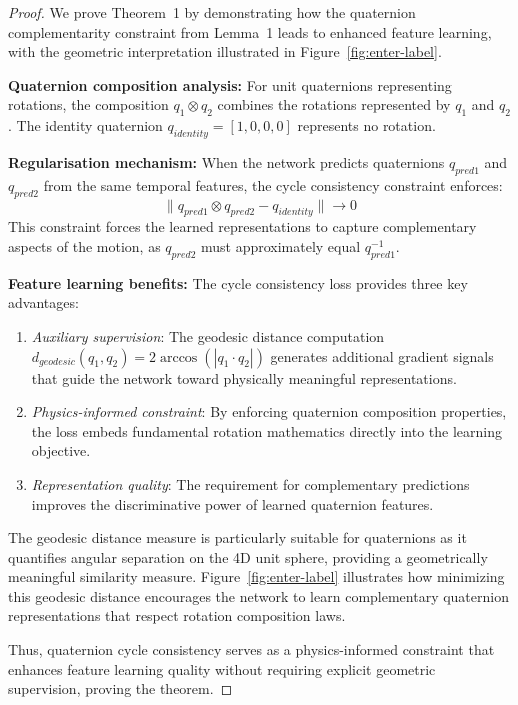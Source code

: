 \documentclass[journal]{IEEEtran}
\theoremstyle{plain}
\begin{document}
\begin{proof}
We prove Theorem~1 by demonstrating how the quaternion complementarity constraint from Lemma~1 leads to enhanced feature learning, with the geometric interpretation illustrated in Figure~\ref{fig:enter-label}.

\textbf{Quaternion composition analysis:}
For unit quaternions representing rotations, the composition $q_1 \otimes q_2$ combines the rotations represented by $q_1$ and $q_2$. The identity quaternion $q_{identity} = [1, 0, 0, 0]$ represents no rotation.

\textbf{Regularisation mechanism:}
When the network predicts quaternions $q_{pred1}$ and $q_{pred2}$ from the same temporal features, the cycle consistency constraint enforces:
\begin{equation}
\|q_{pred1} \otimes q_{pred2} - q_{identity}\| \to 0
\end{equation}
This constraint forces the learned representations to capture complementary aspects of the motion, as $q_{pred2}$ must approximately equal $q_{pred1}^{-1}$.

\textbf{Feature learning benefits:}
The cycle consistency loss provides three key advantages:
\begin{enumerate}
    \item \textit{Auxiliary supervision}: The geodesic distance computation $d_{geodesic}(q_1, q_2) = 2\arccos(|q_1 \cdot q_2|)$ generates additional gradient signals that guide the network toward physically meaningful representations.
    \item \textit{Physics-informed constraint}: By enforcing quaternion composition properties, the loss embeds fundamental rotation mathematics directly into the learning objective.
    \item \textit{Representation quality}: The requirement for complementary predictions improves the discriminative power of learned quaternion features.
\end{enumerate}

The geodesic distance measure is particularly suitable for quaternions as it quantifies angular separation on the 4D unit sphere, providing a geometrically meaningful similarity measure. Figure~\ref{fig:enter-label} illustrates how minimizing this geodesic distance encourages the network to learn complementary quaternion representations that respect rotation composition laws.

Thus, quaternion cycle consistency serves as a physics-informed constraint that enhances feature learning quality without requiring explicit geometric supervision, proving the theorem.
\end{proof}
\end{document}
